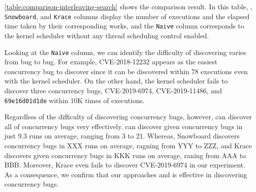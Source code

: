 


%
\autoref{table:comparison-interleaving-search} shows the comparison
result.
%
In this table, \texttt{\sys}, \texttt{Snowboard}, and \texttt{Krace}
columns display the number of executions and the elapsed time taken by
their corresponding works, and the \texttt{Naive} column corresponds
to the kernel scheduler without any thread scheduling control enabled.
%

%
Looking at the \texttt{Naive} column, we can identify the difficulty
of discovering varies from bug to bug.
%
For example, CVE-2018-12232 appears as the easiest concurrency bug to
discover since it can be discovered within 78 executions even with the
kernel scheduler.
%
On the other hand, the kernel scheduler fails to discover three
concurrency bugs, CVE-2019-6974, CVE-2019-11486, and
\texttt{69e16d01d1de} within 10K times of executions.


Regardless of the difficulty of discovering concurrency bugs, however,
\sys can discover all of concurrency bugs very effectively.
%
\sys can discover given concurrency bugs in just 9.3 runs on average,
ranging from 3 to 21.
%
\dr{}Whereas, Snowboard discovers concurrency bugs in XXX runs on
average, ragning from YYY to ZZZ, and Krace discovers given
concurrency bugs in KKK runs on average, raning from AAA to
BBB. Moreover, Krace even fails to discover CVE-2019-6974 in our
experiment.
%
As a consequence, we confirm that our approaches and \sys is effective
in discovering concurrency bugs.










